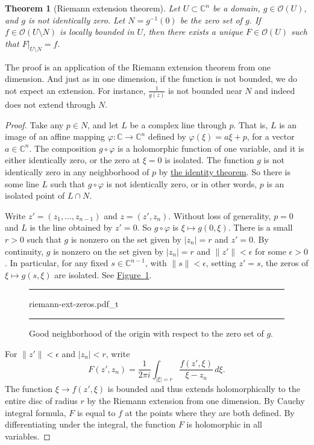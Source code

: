 \documentclass[12pt,openany]{book}
\newcommand{\sabs}[1]{\lvert {#1} \rvert}
\newcommand{\snorm}[1]{\lVert {#1} \rVert}
\newcommand{\abs}[1]{\left\lvert {#1} \right\rvert}
\newcommand{\C}{{\mathbb{C}}}
\newcommand{\sO}{{\mathscr{O}}}
\newcommand{\myindex}[1]{#1\index{#1}}
\theoremstyle{plain}
\newtheorem{thm}{Theorem}[section]
\theoremstyle{remark}
\theoremstyle{definition}
\newenvironment{myfig}{%
\begin{figure}[h!t]
\noindent\rule{\textwidth}{0.5pt}\vspace{12pt}\par\centering}%
{\par\noindent\rule{\textwidth}{0.5pt}
\end{figure}}
\theoremstyle{exercise}
\theoremstyle{example}
\newcommand{\figureref}[1]{\hyperref[#1]{Figure~\ref*{#1}}}
\begin{document}
\begin{thm}[\myindex{Riemann extension theorem}]
Let $U \subset \C^n$ be a domain,  $g \in \sO(U)$, and $g$ is not
identically zero.  Let
$N = g^{-1}(0)$ be the zero set of $g$.
If $f \in \sO(U \setminus N)$ is locally bounded in $U$,
then there exists a unique $F \in \sO(U)$ such that $F|_{U \setminus N} = f$.
\end{thm}

The proof is an application of the Riemann extension theorem from one dimension.
And just as in one dimension, if the function is not bounded, we do not
expect an extension.  For instance, $\frac{1}{g(z)}$ is not bounded near $N$
and indeed does not extend through $N$.

\begin{proof}
Take any $p \in N$, and let $L$ be a complex line through $p$.
That is,
$L$ is an image of an affine mapping
$\varphi \colon \C \to \C^n$ defined by
$\varphi(\xi) = a\xi + p$, for a vector $a \in \C^n$.
The composition $g \circ \varphi$
is a holomorphic function of one variable, and it
is either identically zero, or
the zero at $\xi=0$ is isolated.
The function $g$ is not identically zero in any neighborhood of $p$
by \hyperref[thm:identity]{the identity theorem}.
So there is some line $L$ such that $g \circ \varphi$
is not identically zero, or in other words, $p$
is an isolated point of $L \cap N$.

Write $z' =
(z_1,\ldots,z_{n-1})$ and $z=(z',z_n)$.
Without loss of generality, $p = 0$ and $L$ is the line
obtained by $z' = 0$.
So $g \circ \varphi$ is $\xi \mapsto g(0,\xi)$.
There is a small
$r > 0$ such that $g$ is nonzero on the set
given by $\sabs{z_n} = r$ and $z' = 0$.
By continuity,
$g$ is nonzero on the set given by
$\sabs{z_n} = r$ and $\snorm{z'} <\epsilon$ for some $\epsilon >0$.
In particular, for any fixed $s \in \C^{n-1}$, with $\snorm{s} < \epsilon$,
setting $z' = s$,
the zeros of $\xi \mapsto g(s,\xi)$ are isolated.  See
\figureref{fig:riemann-ext-zeros}.

\begin{myfig}
{riemann-ext-zeros.pdf_t}
\caption{Good neighborhood of the origin with respect to
the zero set of $g$.\label{fig:riemann-ext-zeros}}
\end{myfig}

For $\snorm{z'} <
\epsilon$ and $\abs{z_n} < r$, write
\begin{equation*}
F(z',z_n) =
\frac{1}{2\pi i}
\int_{\sabs{\xi}=r} \frac{f(z',\xi)}{\xi-z_n} \,d\xi .
\end{equation*}
The function $\xi \to f(z',\xi)$ is bounded and thus extends holomorphically to the entire
disc of radius $r$ by the Riemann extension from one dimension.  By Cauchy
integral formula,
$F$ is equal to $f$ at the points where they are both defined.
By differentiating under the integral, the function $F$ is holomorphic
in all variables.


\end{proof}
\end{document}
